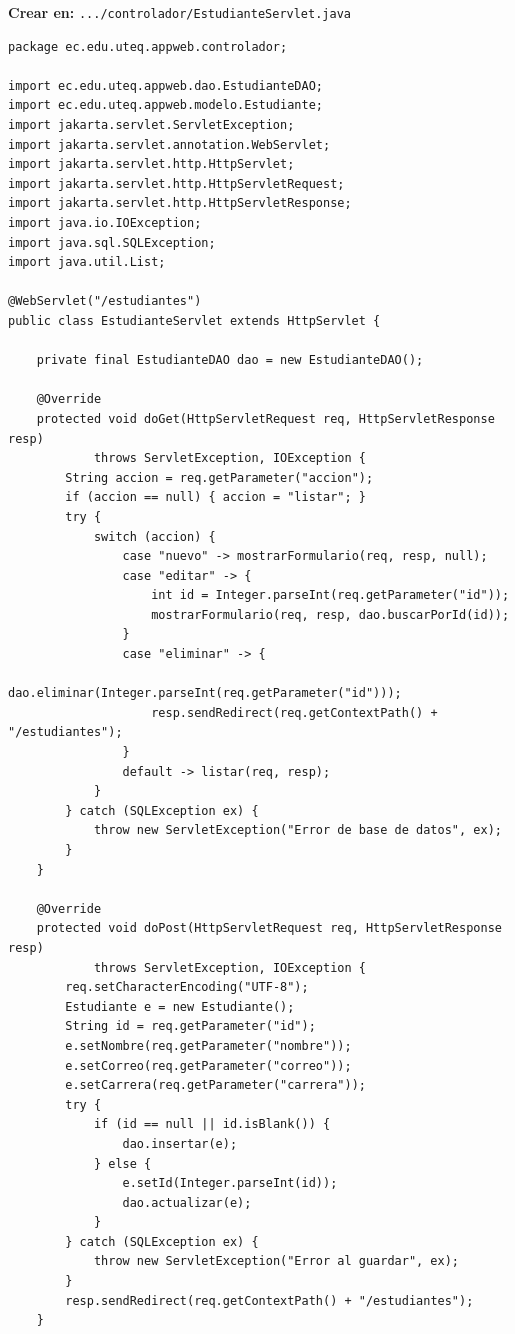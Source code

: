 {\small\textbf{Crear en:} \texttt{.../controlador/EstudianteServlet.java}}
\begin{lstlisting}[style=java,caption={EstudianteServlet.java (control de la peticion)},label={lst:jsp-servlet}]
package ec.edu.uteq.appweb.controlador;

import ec.edu.uteq.appweb.dao.EstudianteDAO;
import ec.edu.uteq.appweb.modelo.Estudiante;
import jakarta.servlet.ServletException;
import jakarta.servlet.annotation.WebServlet;
import jakarta.servlet.http.HttpServlet;
import jakarta.servlet.http.HttpServletRequest;
import jakarta.servlet.http.HttpServletResponse;
import java.io.IOException;
import java.sql.SQLException;
import java.util.List;

@WebServlet("/estudiantes")
public class EstudianteServlet extends HttpServlet {

    private final EstudianteDAO dao = new EstudianteDAO();

    @Override
    protected void doGet(HttpServletRequest req, HttpServletResponse resp)
            throws ServletException, IOException {
        String accion = req.getParameter("accion");
        if (accion == null) { accion = "listar"; }
        try {
            switch (accion) {
                case "nuevo" -> mostrarFormulario(req, resp, null);
                case "editar" -> {
                    int id = Integer.parseInt(req.getParameter("id"));
                    mostrarFormulario(req, resp, dao.buscarPorId(id));
                }
                case "eliminar" -> {
                    dao.eliminar(Integer.parseInt(req.getParameter("id")));
                    resp.sendRedirect(req.getContextPath() + "/estudiantes");
                }
                default -> listar(req, resp);
            }
        } catch (SQLException ex) {
            throw new ServletException("Error de base de datos", ex);
        }
    }

    @Override
    protected void doPost(HttpServletRequest req, HttpServletResponse resp)
            throws ServletException, IOException {
        req.setCharacterEncoding("UTF-8");
        Estudiante e = new Estudiante();
        String id = req.getParameter("id");
        e.setNombre(req.getParameter("nombre"));
        e.setCorreo(req.getParameter("correo"));
        e.setCarrera(req.getParameter("carrera"));
        try {
            if (id == null || id.isBlank()) {
                dao.insertar(e);
            } else {
                e.setId(Integer.parseInt(id));
                dao.actualizar(e);
            }
        } catch (SQLException ex) {
            throw new ServletException("Error al guardar", ex);
        }
        resp.sendRedirect(req.getContextPath() + "/estudiantes");
    }


\end{lstlisting}
